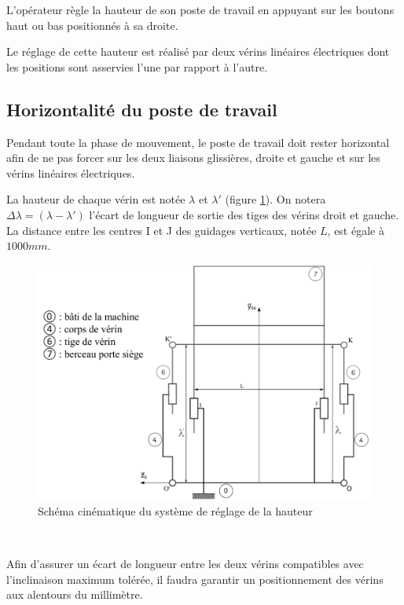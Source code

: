 L’opérateur règle la hauteur de son poste de travail en appuyant sur les boutons \og haut \fg ou \og bas \fg positionnés à sa droite.

Le réglage de cette hauteur est réalisé par deux vérins linéaires électriques dont les positions sont asservies l’une par rapport à l’autre.

\subsection{Horizontalité du poste de travail}

Pendant toute la phase de mouvement, le poste de travail doit rester horizontal afin de ne pas forcer sur les deux liaisons glissières, droite et gauche et sur les vérins linéaires électriques.

La hauteur de chaque vérin est notée $\lambda$ et $\lambda'$ (figure \ref{img17}). On notera $\Delta\lambda=(\lambda-\lambda')$ l’écart de
longueur de sortie des tiges des vérins droit et gauche. La distance entre les centres I et J des guidages verticaux, notée $L$, est égale à $1 000 mm$.

\newpage

\begin{figure}[!h]
\centering\includegraphics[width=0.6\linewidth]{img/fig17}
 \caption{Schéma cinématique du système de réglage de la hauteur}
 \label{img17}
\end{figure}


~\

Afin d’assurer un écart de longueur entre les deux vérins compatibles avec l’inclinaison maximum tolérée, il faudra garantir un positionnement des vérins aux alentours du millimètre.

